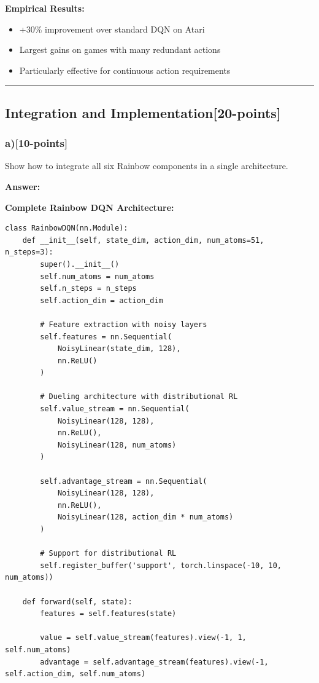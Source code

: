 \documentclass[12pt]{article}
\begin{document}
{{\textbf{Empirical Results:}
\begin{itemize}
\item +30\% improvement over standard DQN on Atari
\item Largest gains on games with many redundant actions
\item Particularly effective for continuous action requirements
\end{itemize}

\noindent\rule{\textwidth}{0.2pt}

\subsection{Integration and Implementation[20-points]}
\subsubsection{a)[10-points]} Show how to integrate all six Rainbow components in a single architecture.

\textbf{Answer:}

\textbf{Complete Rainbow DQN Architecture:}

\begin{verbatim}
class RainbowDQN(nn.Module):
    def __init__(self, state_dim, action_dim, num_atoms=51, n_steps=3):
        super().__init__()
        self.num_atoms = num_atoms
        self.n_steps = n_steps
        self.action_dim = action_dim

        # Feature extraction with noisy layers
        self.features = nn.Sequential(
            NoisyLinear(state_dim, 128),
            nn.ReLU()
        )

        # Dueling architecture with distributional RL
        self.value_stream = nn.Sequential(
            NoisyLinear(128, 128),
            nn.ReLU(),
            NoisyLinear(128, num_atoms)
        )

        self.advantage_stream = nn.Sequential(
            NoisyLinear(128, 128),
            nn.ReLU(),
            NoisyLinear(128, action_dim * num_atoms)
        )

        # Support for distributional RL
        self.register_buffer('support', torch.linspace(-10, 10, num_atoms))

    def forward(self, state):
        features = self.features(state)

        value = self.value_stream(features).view(-1, 1, self.num_atoms)
        advantage = self.advantage_stream(features).view(-1, self.action_dim, self.num_atoms)


\end{verbatim}}}
\end{document}
